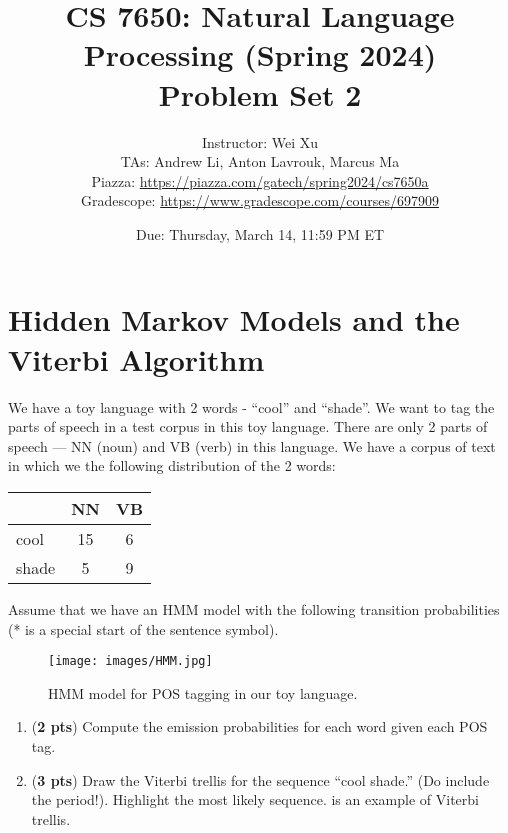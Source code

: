 \documentclass[11pt, letterpaper]{article}
\begin{document}
\title{CS 7650: Natural Language Processing (Spring 2024) \\ Problem Set 2}
\author{Instructor: Wei Xu \\ TAs: Andrew Li, Anton Lavrouk, Marcus Ma
\\Piazza: \url{https://piazza.com/gatech/spring2024/cs7650a}
\\Gradescope: \url{https://www.gradescope.com/courses/697909}}
\date{Due: Thursday, March 14, 11:59 PM ET}
\maketitle

\section{Hidden Markov Models and the Viterbi Algorithm}
    We have a toy language with 2 words - “cool” and “shade”. We want to tag the parts of speech in a test corpus in this toy language. There are only 2 parts of speech — NN (noun) and VB (verb) in this language. We have a corpus of text in which we the following distribution of the 2 words:
    
    \begin{table}[h!]
    \centering
    \small
    \begin{tabular}{|l | c | c |}
    \hline & NN & VB\\
    \hline
    cool & 15 & 6 \\
    shade & 5 & 9\\
    \hline
    \end{tabular}
    \end{table}
    Assume that we have an HMM model with the following transition probabilities (* is a special start of the sentence symbol).
    
    \begin{figure}[h]
    \centering
    \texttt{[image: images/HMM.jpg]}
    \caption{HMM model for POS tagging in our toy language.}
    \end{figure}

\begin{enumerate}[label=(\alph*)]
\item (\textbf{2 pts}) Compute the emission probabilities for each word given each POS tag.\\

\item (\textbf{3 pts}) Draw the Viterbi trellis for the sequence “cool shade.” (Do include the period!). Highlight the most likely sequence. \href{https://web.stanford.edu/~jurafsky/slp3/A.pdf#page=8}{\color{blue}{Here}} is an  example of Viterbi trellis.

\end{enumerate}
\end{document}
